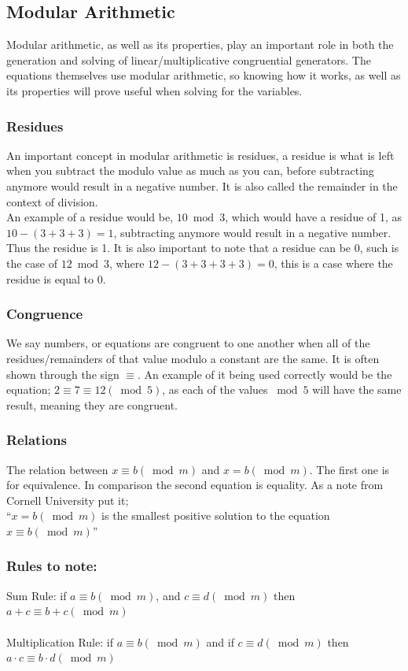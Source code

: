 \documentclass[12pft, english]{article}
\begin{document}
\begin{multicols}{2}
  \subsection{Modular Arithmetic}
  Modular arithmetic, as well as its properties, play an important role in both the generation and solving of linear/multiplicative congruential generators. The equations themselves use modular arithmetic, so knowing how it works, as well as its properties will prove useful when solving for the variables. \citep{modArth}
  \subsubsection{Residues}
  An important concept in modular arithmetic is residues, a residue is what is left when you subtract the modulo value as much as you can, before subtracting anymore would result in a negative number. It is also called the remainder in the context of division. \\
  An example of a residue would be, \( 10 \bmod 3\), which would have a residue of 1, as \(10 - ( 3 + 3 + 3 ) = 1\), subtracting anymore would result in a negative number. Thus the residue is 1. It is also important to note that a residue can be 0, such is the case of \( 12 \bmod 3\), where \( 12 - ( 3 + 3 + 3 + 3 ) = 0\), this is a case where the residue is equal to 0. \citep{modArth}
  \subsubsection{Congruence}
  We say numbers, or equations are congruent to one another when all of the residues/remainders of that value modulo a constant are the same. It is often shown through the sign \( \equiv \). An example of it being used correctly would be the equation; \( 2 \equiv 7 \equiv 12 (\bmod 5)\), as each of the values \( \bmod 5\) will have the same result, meaning they are congruent. \citep{modArth}
  \subsubsection{Relations}
  The relation between \(x \equiv b (\bmod m)\) and \(x = b (\bmod m )\). The first one is for equivalence. In comparison the second equation is equality. As a note from Cornell University put it; \\ ``\(x = b (\bmod m)\) is the smallest positive solution to the equation \( x \equiv b (\bmod m)\)'' \cite{cornelMod}
  \subsubsection{Rules to note:}
  Sum Rule: if \(a \equiv b ( \bmod m)\), and \(c \equiv d (\bmod m)\) then \( a + c \equiv b + c(\bmod m)\) \cite{cornelMod} \\ \\
  Multiplication Rule: if \(a \equiv b (\bmod m)\) and if \(c \equiv d (\bmod m)\) then \( a \cdot c \equiv b \cdot d (\bmod m)\)  \cite{cornelMod} \

\end{multicols}
\end{document}
